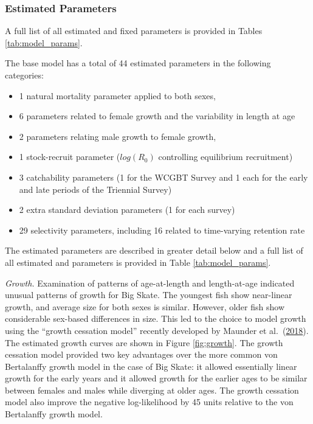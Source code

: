 \documentclass[12pt,]{article}
\begin{document}
\hypertarget{estimated-parameters}{%
\subsubsection{Estimated Parameters}\label{estimated-parameters}}

A full list of all estimated and fixed parameters is provided in Tables
\ref{tab:model_params}.

The base model has a total of 44 estimated parameters in the following
categories:

\begin{itemize}
  \item 1 natural mortality parameter applied to both sexes,
  \item 6 parameters related to female growth and the variability in length at age
  \item 2 parameters relating male growth to female growth,
  \item 1 stock-recruit parameter ($log(R_0)$ controlling equilibrium recruitment)
  \item 3 catchability parameters (1 for the WCGBT Survey and 1 each for the early and late periods of the Triennial Survey)
  \item 2 extra standard deviation parameters (1 for each survey)
  \item 29 selectivity parameters, including 16 related to time-varying retention rate
\end{itemize}

The estimated parameters are described in greater detail below and a
full list of all estimated and parameters is provided in Table
\ref{tab:model_params}.

\emph{Growth.} Examination of patterns of age-at-length and
length-at-age indicated unusual patterns of growth for Big Skate. The
youngest fish show near-linear growth, and average size for both sexes
is similar. However, older fish show considerable sex-based differences
in size. This led to the choice to model growth using the ``growth
cessation model'' recently developed by Maunder et
al.~(\protect\hyperlink{ref-maunder2018growth}{2018}). The estimated
growth curves are shown in Figure \ref{fig:growth}. The growth cessation
model provided two key advantages over the more common von Bertalanffy
growth model in the case of Big Skate: it allowed essentially linear
growth for the early years and it allowed growth for the earlier ages to
be similar between females and males while diverging at older ages. The
growth cessation model also improve the negative log-likelihood by 45
units relative to the von Bertalanffy growth model.
\end{document}
